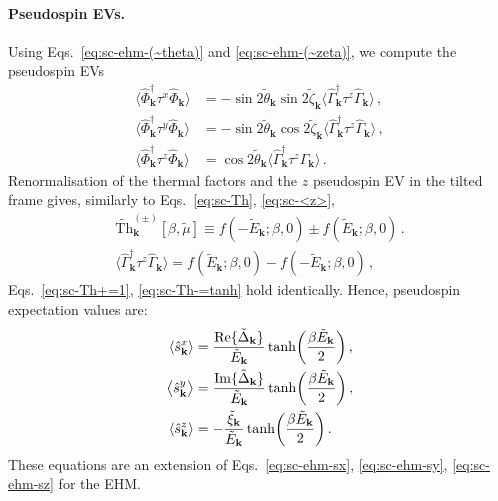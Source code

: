 \paragraph{Pseudospin EVs.}

Using Eqs.~\eqref{eq:sc-ehm-(~theta)} and \eqref{eq:sc-ehm-(~zeta)}, we compute the pseudospin EVs
\begin{align}
	\langle \hat \Phi_\mathbf{k}^\dagger \tau^x \hat \Phi_\mathbf{k} \rangle &= -\sin 2\tilde{\theta}_\mathbf{k} \sin 2\tilde{\zeta}_\mathbf{k} \langle \hat \Gamma_\mathbf{k}^\dagger \tau^z \hat \Gamma_\mathbf{k} \rangle \, , \label{eq:sc-x-expectation-non-local} \\
	\langle \hat \Phi_\mathbf{k}^\dagger \tau^y \hat \Phi_\mathbf{k} \rangle &= -\sin 2\tilde{\theta}_\mathbf{k} \cos 2\tilde{\zeta}_\mathbf{k} \langle \hat \Gamma_\mathbf{k}^\dagger \tau^z \hat \Gamma_\mathbf{k} \rangle \, , \label{eq:sc-y-expectation-non-local} \\
	\langle \hat \Phi_\mathbf{k}^\dagger \tau^z \hat \Phi_\mathbf{k} \rangle &= \cos 2\tilde{\theta}_\mathbf{k} \langle \hat \Gamma_\mathbf{k}^\dagger \tau^z \hat \Gamma_\mathbf{k} \rangle \, . \label{eq:sc-z-expectation-non-local}
\end{align}
Renormalisation of the thermal factors and the $z$ pseudospin EV in the tilted frame gives, similarly to Eqs.~\eqref{eq:sc-Th}, \eqref{eq:sc-<z>},
\begin{align}
	\tilde{\mathrm{Th}}_\mathbf{k}^{(\pm)}[\beta,\tilde{\mu}] \equiv
	f\left(
	-\tilde{E}_\mathbf{k};\beta,0
	\right) \pm f\left(
	\tilde{E}_\mathbf{k};\beta,0
	\right) \, . \label{eq:sc-~Th} \\
	\langle \hat \Gamma_\mathbf{k}^\dagger \tau^z \hat \Gamma_\mathbf{k} \rangle = 
	f\left(
	\tilde{E}_\mathbf{k};\beta,0
	\right) - f\left(
	-\tilde{E}_\mathbf{k};\beta,0
	\right) \, ,\label{eq:sc-<~z>}
\end{align}
Eqs.~\eqref{eq:sc-Th+=1}, \eqref{eq:sc-Th-=tanh} hold identically. Hence, pseudospin expectation values are:
\begin{align}
	\ev{\hat s_\mathbf{k}^x} &= \frac{\Re \lbrace \tilde{\Delta}_\mathbf{k} \rbrace}{\tilde{E}_\mathbf{k}} \tanh(\frac{\beta \tilde{E}_\mathbf{k}}{2}) \, , \label{eq:sc-ehm-sx} \\
	\ev{\hat s_\mathbf{k}^y} &= \frac{\Im \lbrace \tilde{\Delta}_\mathbf{k} \rbrace}{\tilde{E}_\mathbf{k}} \tanh(\frac{\beta \tilde{E}_\mathbf{k}}{2}) \, , \label{eq:sc-ehm-sy}\\
	\ev{\hat s_\mathbf{k}^z} &=  -\frac{\tilde{\xi}_\mathbf{k}}{\tilde{E}_\mathbf{k}} \tanh(\frac{\beta \tilde{E}_\mathbf{k}}{2}) \, . \label{eq:sc-ehm-sz}
\end{align}
These equations are an extension of Eqs.~\eqref{eq:sc-ehm-sx}, \eqref{eq:sc-ehm-sy}, \eqref{eq:sc-ehm-sz} for the EHM. 

